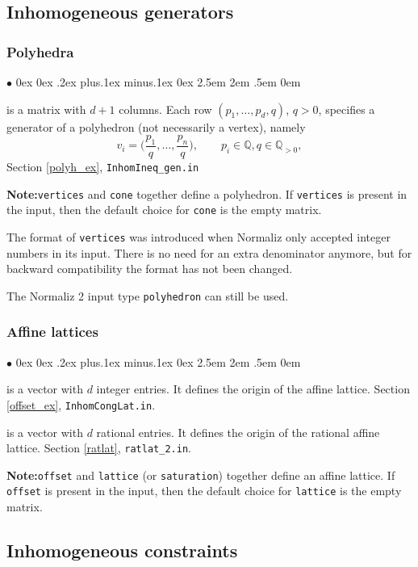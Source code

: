 \documentclass[12pt,a4paper]{scrartcl}
\newcommand{\stdli}{ \topsep0ex \partopsep0ex %
\parsep.2ex plus.1ex minus.1ex \itemsep0ex%
\leftmargin2.5em \labelwidth2em \labelsep.5em \rightmargin0em}%
\renewenvironment{itemize}{\begin{list}{{$\bullet$}}{\stdli}}{\end{list}}
\theoremstyle{definition}
\def\QQ{{\mathbb Q}}
\def\itemtt[#1]{\item[\textbf{\ttt{#1}}]}
\def\ttt{\texttt}
\begin{document}
\subsection{Inhomogeneous generators}

\subsubsection{Polyhedra}

\begin{itemize}
	\itemtt[vertices] is a matrix with $d+1$ columns. Each row $(p_1,\dots,p_d,q)$, $q>0$, specifies a generator of a polyhedron (not necessarily a vertex), namely
	$$
	v_i=\biggl(\frac{p_{1}}{q},\dots,\frac{p_{n}}{q}\biggr), \qquad p_i\in\QQ,q\in\QQ_{>0},
	$$
	Section \ref{polyh_ex}, \verb|InhomIneq_gen.in|
	
	\textbf{Note:}\enspace \verb|vertices| and \verb|cone| together define a polyhedron. If \verb|vertices| is present in the input, then the default choice for \verb|cone| is the empty matrix.
\end{itemize}

The format of \verb|vertices| was introduced when Normaliz only accepted integer numbers in its input. There is no need for an extra denominator anymore, but for backward compatibility the format has not been changed.

The Normaliz 2 input type \verb|polyhedron| can still be used.

\subsubsection{Affine lattices}

\begin{itemize}
	\itemtt[offset] is a vector with $d$ integer entries. It defines the origin of the affine lattice.
	Section \ref{offset_ex}, \verb|InhomCongLat.in|.
	
	\itemtt[rational\_offset] is a vector with $d$ rational entries. It defines the origin of the rational affine lattice.
	Section \ref{ratlat}, \verb|ratlat_2.in|.
\end{itemize}

\textbf{Note:}\enspace \verb|offset| and \verb|lattice| (or \verb|saturation|) together define an affine lattice. If \verb|offset| is present in the input, then the default choice for \verb|lattice| is the empty matrix.

\subsection{Inhomogeneous constraints}
\end{document}
